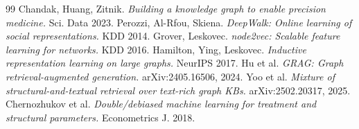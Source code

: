 \documentclass[11pt]{article}
\begin{document}
\begin{thebibliography}{99}
 Chandak, Huang, Zitnik. \textit{Building a knowledge graph to enable precision medicine.} Sci. Data 2023.
 Perozzi, Al-Rfou, Skiena. \textit{DeepWalk: Online learning of social representations.} KDD 2014.
 Grover, Leskovec. \textit{node2vec: Scalable feature learning for networks.} KDD 2016.
 Hamilton, Ying, Leskovec. \textit{Inductive representation learning on large graphs.} NeurIPS 2017.
 Hu et al. \textit{GRAG: Graph retrieval-augmented generation.} arXiv:2405.16506, 2024.
 Yoo et al. \textit{Mixture of structural-and-textual retrieval over text-rich graph KBs.} arXiv:2502.20317, 2025.
 Chernozhukov et al. \textit{Double/debiased machine learning for treatment and structural parameters.} Econometrics J. 2018.
\end{thebibliography}
\end{document}
